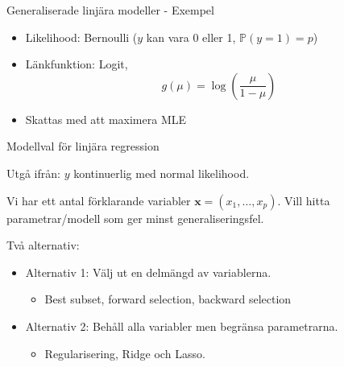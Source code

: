 \documentclass[10pt,english]{beamer}
\begin{document}
\begin{frame}{Generaliserade linjära modeller - Exempel}
    \begin{itemize}
        \item Likelihood: Bernoulli ($y$ kan vara 0 eller 1, $\mathbb{P}(y = 1) = p$)
        \item L\"ankfunktion: Logit,
        \begin{equation*}
            g(\mu) = \log\left( \frac{\mu}{1-\mu} \right)
        \end{equation*}
        \item Skattas med att maximera MLE
    \end{itemize}
\end{frame}


\begin{frame}{Modellval för linjära regression}

    Utgå ifrån: $y$ kontinuerlig med normal likelihood.

    Vi har ett antal förklarande variabler $\mathbf{x} = (x_1, \ldots, x_p)$. Vill hitta parametrar/modell som ger minst generaliseringsfel.

    Två alternativ:
    \begin{itemize}
        \item Alternativ 1: Välj ut en delmängd av variablerna.
        \begin{itemize}
            \item Best subset, forward selection, backward selection
        \end{itemize}
        \item Alternativ 2: Behåll alla variabler men begränsa parametrarna.
        \begin{itemize}
            \item Regularisering, Ridge och Lasso.
        \end{itemize}  
    \end{itemize}
    
\end{frame}
\end{document}
